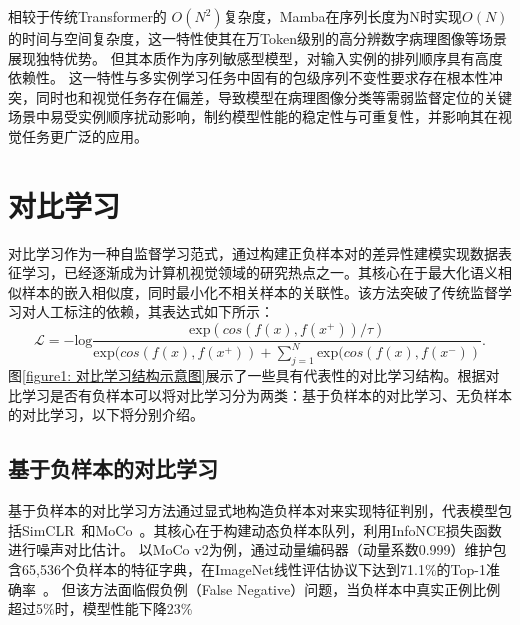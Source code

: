 相较于传统Transformer的 $O(N^2)$复杂度，Mamba在序列长度为N时实现$O(N)$ 的时间与空间复杂度，这一特性使其在万Token级别的高分辨数字病理图像等场景展现独特优势。
但其本质作为序列敏感型模型，对输入实例的排列顺序具有高度依赖性。
这一特性与多实例学习任务中固有的包级序列不变性要求存在根本性冲突，同时也和视觉任务存在偏差，导致模型在病理图像分类等需弱监督定位的关键场景中易受实例顺序扰动影响，制约模型性能的稳定性与可重复性，并影响其在视觉任务更广泛的应用。


\section[\hspace{-2pt}对比学习]{{\heiti{} \hspace{-8pt}对比学习}}\label{section2: 对比学习}

对比学习作为一种自监督学习范式，通过构建正负样本对的差异性建模实现数据表征学习，已经逐渐成为计算机视觉领域的研究热点之一。其核心在于最大化语义相似样本的嵌入相似度，同时最小化不相关样本的关联性。该方法突破了传统监督学习对人工标注的依赖，其表达式如下所示：
\begin{equation}
\label{equation2: infoNCE}
\mathcal{L} = - \text{log}\frac{\text{exp}(cos(f(x), f(x^+)) / \tau)}{\text{exp}(cos(f(x), f(x^+)) + \sum_{j=1}^{N} \text{exp}(cos(f(x), f(x^-))}.
\end{equation}
图\ref{figure1: 对比学习结构示意图}展示了一些具有代表性的对比学习结构。根据对比学习是否有负样本可以将对比学习分为两类：基于负样本的对比学习、无负样本的对比学习，以下将分别介绍。

\subsection[\hspace{-2pt}基于负样本的对比学习]{{\heiti{} \hspace{-8pt}基于负样本的对比学习}}\label{section2: 基于负样本的对比学习}

基于负样本的对比学习方法通过显式地构造负样本对来实现特征判别，代表模型包括SimCLR~\cite{chen2020simple}和MoCo~\cite{he2020momentum}。其核心在于构建动态负样本队列，利用InfoNCE损失函数进行噪声对比估计。
以MoCo v2为例，通过动量编码器（动量系数0.999）维护包含65,536个负样本的特征字典，在ImageNet线性评估协议下达到71.1\%的Top-1准确率~\cite{chen2020improved}。
但该方法面临假负例（False Negative）问题，当负样本中真实正例比例超过5\%时，模型性能下降23\%~\cite{chen2021incremental}

